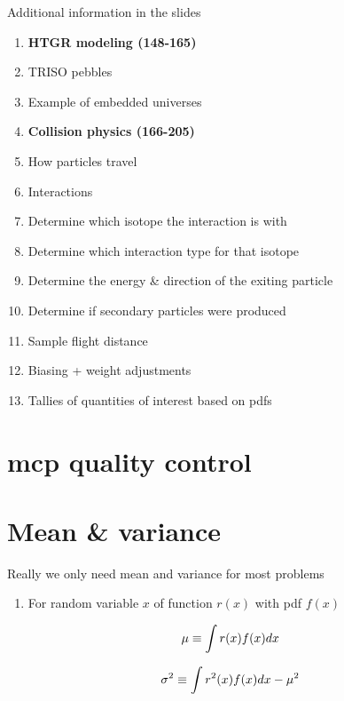 \documentclass[aspectratio=1610,pdftex,dvipsnames,compress,xcolor={dvipsnames}]{beamer}
\newcommand{\acs}{\acrshort} %
\begin{document}
\addtocounter{framenumber}{-1} 
\begin{frame}{Additional information in the slides}
    \begin{enumerate}[series=outerlist,topsep=0pt,itemsep=3pt,leftmargin=*,label=(\arabic*)]
        \item[]\textbf{HTGR modeling (148-165)}
        \item[]TRISO pebbles
        \item[]Example of embedded universes
            \vspace{0.05in}
        \item[]\textbf{Collision physics (166-205)}
        \item[]How particles travel
        \item[]Interactions
        \item[]Determine which isotope the interaction is with  
        \item[]Determine which interaction type for that isotope  
        \item[]Determine the energy \& direction of the exiting particle  
        \item[]Determine if secondary particles were produced  
        \item[]Sample flight distance  
        \item[]Biasing + weight adjustments  
        \item[]Tallies of quantities of interest based on pdfs
    \end{enumerate}
\end{frame}


\section{\acs{mcp} quality control}
\section{Mean \& variance}


\addtocounter{framenumber}{-2} 
\begin{frame}{Really we only need mean and variance for most problems}
    \begin{enumerate}[series=outerlist,topsep=0pt,itemsep=21pt,leftmargin=*,label=(\arabic*)]
        \item[]For random variable $x$ of function $r(x)$ with pdf $f(x)$
    \end{enumerate}

    \vspace*{\fill}

    \begin{equation}
        \LARGE
         \mu \equiv \int r(x)f(x)dx
    \end{equation}

    \begin{equation}
        \LARGE
        \sigma^2 \equiv \int r^2(x)f(x)dx -\mu^2
    \end{equation}
\end{frame}
\end{document}
